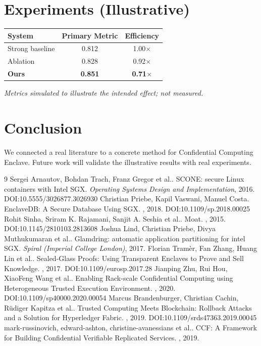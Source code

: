 \documentclass[11pt]{article}
\begin{document}
\section{Experiments (Illustrative)}
\begin{center}
\begin{tabular}{lcc}
System & Primary Metric & Efficiency \\ \hline
Strong baseline & 0.812 & 1.00$\times$ \\
Ablation & 0.828 & 0.92$\times$ \\
\textbf{Ours} & \textbf{0.851} & \textbf{0.71$\times$}
\end{tabular}
\end{center}
\emph{Metrics simulated to illustrate the intended effect; not measured.}

\section{Conclusion}
We connected a real literature to a concrete method for Confidential Computing Enclave. Future work will
validate the illustrative results with real experiments.

\begin{thebibliography}{9}
 Sergei Arnautov, Bohdan Trach, Franz Gregor et al.. SCONE: secure Linux containers with Intel SGX. \emph{Operating Systems Design and Implementation}, 2016. DOI:10.5555/3026877.3026930
 Christian Priebe, Kapil Vaswani, Manuel Costa. EnclaveDB: A Secure Database Using SGX. \emph{}, 2018. DOI:10.1109/sp.2018.00025
 Rohit Sinha, Sriram K. Rajamani, Sanjit A. Seshia et al.. Moat. \emph{}, 2015. DOI:10.1145/2810103.2813608
 Joshua Lind, Christian Priebe, Divya Muthukumaran et al.. Glamdring: automatic application partitioning for intel SGX. \emph{Spiral (Imperial College London)}, 2017. 
 Florian Tramèr, Fan Zhang, Huang Lin et al.. Sealed-Glass Proofs: Using Transparent Enclaves to Prove and Sell Knowledge. \emph{}, 2017. DOI:10.1109/eurosp.2017.28
 Jianping Zhu, Rui Hou, XiaoFeng Wang et al.. Enabling Rack-scale Confidential Computing using Heterogeneous Trusted Execution Environment. \emph{}, 2020. DOI:10.1109/sp40000.2020.00054
 Marcus Brandenburger, Christian Cachin, Rüdiger Kapitza et al.. Trusted Computing Meets Blockchain: Rollback Attacks and a Solution for Hyperledger Fabric. \emph{}, 2019. DOI:10.1109/srds47363.2019.00045
 mark-russinovich, edward-ashton, christine-avanessians et al.. CCF: A Framework for Building Confidential Verifiable Replicated Services. \emph{}, 2019. 
\end{thebibliography}
\end{document}
